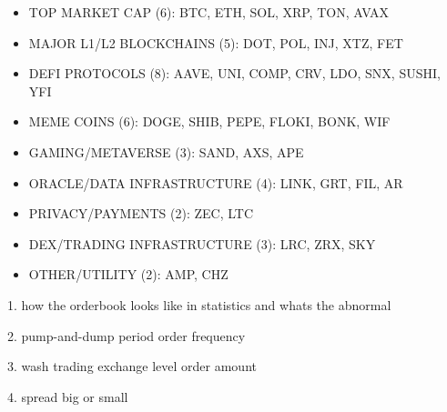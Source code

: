 \begin{itemize}
\item TOP MARKET CAP (6): BTC, ETH, SOL, XRP, TON, AVAX

\item MAJOR L1/L2 BLOCKCHAINS (5): DOT, POL, INJ, XTZ, FET

\item DEFI PROTOCOLS (8): AAVE, UNI, COMP, CRV, LDO, SNX, SUSHI, YFI

\item MEME COINS (6): DOGE, SHIB, PEPE, FLOKI, BONK, WIF

\item GAMING/METAVERSE (3): SAND, AXS, APE

\item ORACLE/DATA INFRASTRUCTURE (4): LINK, GRT, FIL, AR

\item PRIVACY/PAYMENTS (2): ZEC, LTC

\item DEX/TRADING INFRASTRUCTURE (3): LRC, ZRX, SKY

\item OTHER/UTILITY (2): AMP, CHZ
\end{itemize}

1. how the orderbook looks like in statistics and whats the abnormal 

2. pump-and-dump period order frequency

3. wash trading exchange level order amount

4. spread big or small
